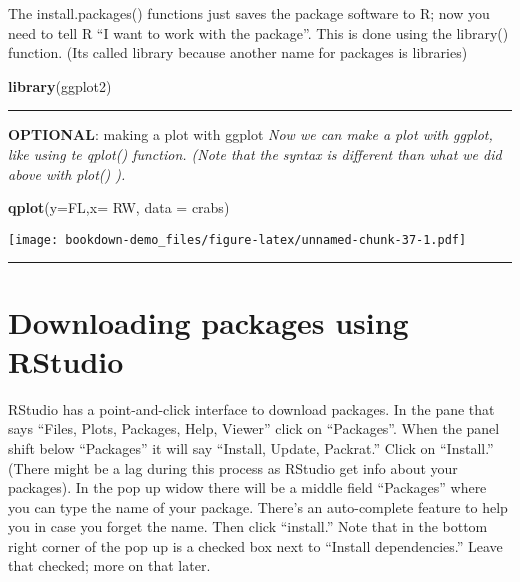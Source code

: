 \documentclass[]{book}
\newenvironment{Shaded}{\begin{snugshade}}{\end{snugshade}}
\newcommand{\KeywordTok}[1]{\textcolor[rgb]{0.13,0.29,0.53}{\textbf{#1}}}
\newcommand{\DataTypeTok}[1]{\textcolor[rgb]{0.13,0.29,0.53}{#1}}
\newcommand{\NormalTok}[1]{#1}
\theoremstyle{definition}
\theoremstyle{definition}
\theoremstyle{definition}
\theoremstyle{remark}
\begin{document}
The install.packages() functions just saves the package software to R;
now you need to tell R ``I want to work with the package''. This is done
using the library() function. (Its called library because another name
for packages is libraries)

\begin{Shaded}
\begin{Highlighting}[]
\KeywordTok{library}\NormalTok{(ggplot2)}
\end{Highlighting}
\end{Shaded}

\begin{center}\rule{0.5\linewidth}{\linethickness}\end{center}

\textbf{OPTIONAL}: making a plot with ggplot \emph{Now we can make a
plot with ggplot, like using te qplot() function. (Note that the syntax
is different than what we did above with plot() ).}

\begin{Shaded}
\begin{Highlighting}[]
\KeywordTok{qplot}\NormalTok{(}\DataTypeTok{y=}\NormalTok{FL,}\DataTypeTok{x=}\NormalTok{ RW, }\DataTypeTok{data =}\NormalTok{ crabs)}
\end{Highlighting}
\end{Shaded}

\texttt{[image: bookdown-demo\_files/figure-latex/unnamed-chunk-37-1.pdf]}

\begin{center}\rule{0.5\linewidth}{\linethickness}\end{center}

\section{\texorpdfstring{\protect\hyperlink{section-3}{} Downloading
packages using
RStudio}{ Downloading packages using RStudio}}\label{downloading-packages-using-rstudio}

RStudio has a point-and-click interface to download packages. In the
pane that says ``Files, Plots, Packages, Help, Viewer'' click on
``Packages''. When the panel shift below ``Packages'' it will say
``Install, Update, Packrat.'' Click on ``Install.'' (There might be a
lag during this process as RStudio get info about your packages). In the
pop up widow there will be a middle field ``Packages'' where you can
type the name of your package. There's an auto-complete feature to help
you in case you forget the name. Then click ``install.'' Note that in
the bottom right corner of the pop up is a checked box next to ``Install
dependencies.'' Leave that checked; more on that later.
\end{document}
